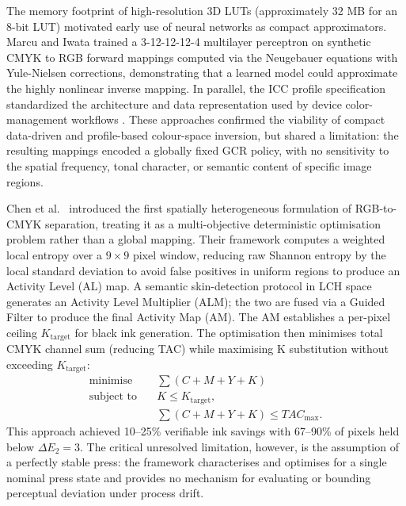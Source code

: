 \documentclass[acmsmall,screen,nonacm]{acmart}
\begin{document}
The memory footprint of high-resolution 3D LUTs (approximately 32 MB for an 8-bit LUT) motivated early use of neural networks as compact approximators. Marcu and Iwata \cite{marcu} trained a 3-12-12-12-4 multilayer perceptron on synthetic CMYK to RGB forward mappings computed via the Neugebauer equations with Yule-Nielsen corrections, demonstrating that a learned model could approximate the highly nonlinear inverse mapping. In parallel, the ICC profile specification standardized the architecture and data representation used by device color-management workflows \cite{icc}. These approaches confirmed the viability of compact data-driven and profile-based colour-space inversion, but shared a limitation: the resulting mappings encoded a globally fixed GCR policy, with no sensitivity to the spatial frequency, tonal character, or semantic content of specific image regions.

Chen et al.\ \cite{chen} introduced the first spatially heterogeneous formulation of RGB-to-CMYK separation, treating it as a multi-objective deterministic optimisation problem rather than a global mapping. Their framework computes a weighted local entropy over a $9\times 9$ pixel window, reducing raw Shannon entropy by the local standard deviation to avoid false positives in uniform regions to produce an Activity Level (AL) map. A semantic skin-detection protocol in LCH space generates an Activity Level Multiplier (ALM); the two are fused via a Guided Filter to produce the final Activity Map (AM). The AM establishes a per-pixel ceiling $K_{\text{target}}$ for black ink generation. The optimisation then minimises total CMYK channel sum (reducing TAC) while maximising K substitution without exceeding $K_{\text{target}}$:
\[
\begin{aligned}
\text{minimise}\quad & \sum (C + M + Y + K) \\
\text{subject to}\quad & K \leq K_{\text{target}}, \\
& \sum (C + M + Y + K) \leq TAC_{\max}.
\end{aligned}
\]
This approach achieved 10--25\% verifiable ink savings with 67--90\% of pixels held below $\Delta E_2 = 3$. The critical unresolved limitation, however, is the assumption of a perfectly stable press: the framework characterises and optimises for a single nominal press state and provides no mechanism for evaluating or bounding perceptual deviation under process drift.
\end{document}
